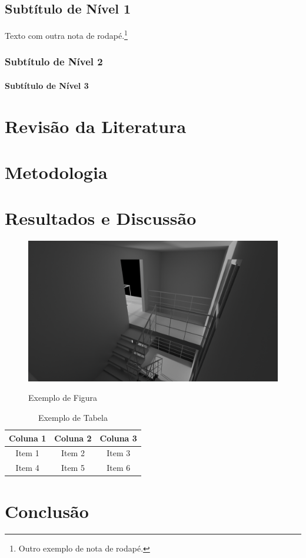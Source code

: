 \documentclass[12pt,a4paper,oneside,brazil]{abntex2}
\begin{document}
\section{Subtítulo de Nível 1}
Texto com outra nota de rodapé.\footnote{Outro exemplo de nota de rodapé.} \lipsum[2-3]

\subsection{Subtítulo de Nível 2}
\lipsum[4]
\subsubsection{Subtítulo de Nível 3}
\lipsum[5]
\lipsum[5]

\chapter{Revisão da Literatura}
\lipsum[6-7]

\chapter{Metodologia}
\lipsum[8-9]

\chapter{Resultados e Discussão}
\lipsum[10]

\begin{figure}[ht]
    \centering
    \caption{Exemplo de Figura}
    \includegraphics[width=1.0\textwidth]{./src/assets/untitled.png}
    \label{fig:exemplo}
\end{figure}

\begin{table}[ht]
    \centering
    \caption{Exemplo de Tabela}
    \begin{tabular}{|c|c|c|}
        \hline
        Coluna 1 & Coluna 2 & Coluna 3 \\ \hline
        Item 1   & Item 2   & Item 3   \\ \hline
        Item 4   & Item 5   & Item 6   \\ \hline
    \end{tabular}
    \label{tab:exemplo}
\end{table}

\chapter{Conclusão}
\lipsum[11-12]


\end{document}
